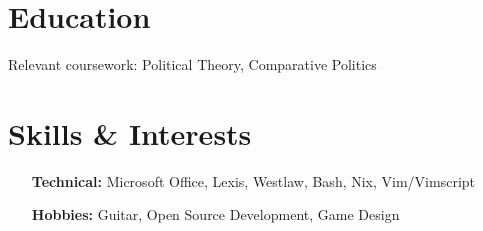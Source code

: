 \documentclass[letterpaper]{resume-shreeram}
\begin{document}
\section{Education}

\begin{compactitem}
  \item Relevant coursework: Political Theory, Comparative Politics
\end{compactitem}



\section{Skills \& Interests}

\begin{itemize}
  \item[\bfseries Technical:] Microsoft Office, Lexis, Westlaw, Bash,
    Nix, Vim/Vimscript

  \item[\bfseries Hobbies:] Guitar, Open Source Development, Game Design
\end{itemize}
\end{document}

